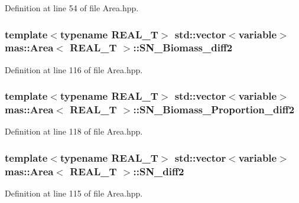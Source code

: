 Definition at line 54 of file Area.\-hpp.

\hypertarget{structmas_1_1_area_aea96de5bbac44de13b5e79a75a270cbd}{
\subsubsection[{S\-N\-\_\-\-Biomass\-\_\-diff2}]{\setlength{\rightskip}{0pt plus 5cm}template$<$typename R\-E\-A\-L\-\_\-\-T$>$ std\-::vector$<${\bf variable}$>$ {\bf mas\-::\-Area}$<$ R\-E\-A\-L\-\_\-\-T $>$\-::S\-N\-\_\-\-Biomass\-\_\-diff2}}\label{structmas_1_1_area_aea96de5bbac44de13b5e79a75a270cbd}


Definition at line 116 of file Area.\-hpp.

\hypertarget{structmas_1_1_area_a0fb7cac6b986e07c833a1b55b48b8327}{
\subsubsection[{S\-N\-\_\-\-Biomass\-\_\-\-Proportion\-\_\-diff2}]{\setlength{\rightskip}{0pt plus 5cm}template$<$typename R\-E\-A\-L\-\_\-\-T$>$ std\-::vector$<${\bf variable}$>$ {\bf mas\-::\-Area}$<$ R\-E\-A\-L\-\_\-\-T $>$\-::S\-N\-\_\-\-Biomass\-\_\-\-Proportion\-\_\-diff2}}\label{structmas_1_1_area_a0fb7cac6b986e07c833a1b55b48b8327}


Definition at line 118 of file Area.\-hpp.

\hypertarget{structmas_1_1_area_a3107466153d6d6c2970e3666266eb02a}{
\subsubsection[{S\-N\-\_\-diff2}]{\setlength{\rightskip}{0pt plus 5cm}template$<$typename R\-E\-A\-L\-\_\-\-T$>$ std\-::vector$<${\bf variable}$>$ {\bf mas\-::\-Area}$<$ R\-E\-A\-L\-\_\-\-T $>$\-::S\-N\-\_\-diff2}}\label{structmas_1_1_area_a3107466153d6d6c2970e3666266eb02a}


Definition at line 115 of file Area.\-hpp.

